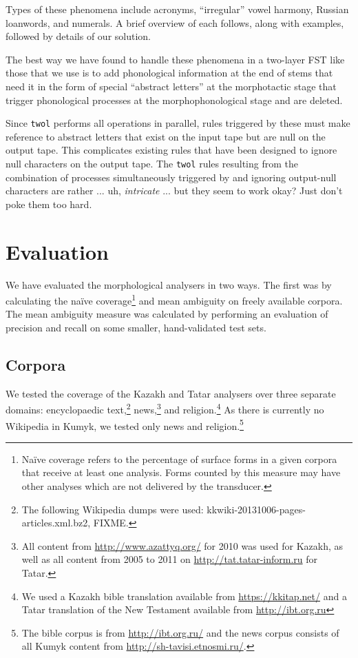\documentclass[a4paper,11pt,twocolumn]{article}
\begin{document}
Types of these phenomena include acronyms, ``irregular'' vowel harmony, Russian loanwords, and numerals.  A brief overview of each follows, along with examples, followed by details of our solution.


The best way we have found to handle these phenomena in a two-layer FST like those that we use is to add phonological information at the end of stems that need it in the form of special ``abstract letters'' at the morphotactic stage that trigger phonological processes at the morphophonological stage and are deleted.


Since \texttt{twol} performs all operations in parallel, rules triggered by these must make reference to abstract letters that exist on the input tape but are null on the output tape.  This complicates existing rules that have been designed to ignore null characters on the output tape.  The \texttt{twol} rules resulting from the combination of processes simultaneously triggered by and ignoring output-null characters are rather ... uh, \textit{intricate} ... but they seem to work okay?  Just don't poke them too hard.  %


\section{Evaluation}

We have evaluated the morphological analysers in two ways. The first was by calculating the naïve coverage\footnote{Naïve coverage refers to the percentage of surface forms in a given corpora that receive at least one analysis.  Forms counted by this measure may have other analyses which are not delivered by the transducer.} and mean ambiguity  on freely available corpora. The mean ambiguity measure was calculated by performing an evaluation of precision and recall on some smaller, hand-validated test sets.

\subsection{Corpora}

We tested the coverage of the Kazakh and Tatar analysers over three separate domains: encyclopaedic text,\footnote{The following Wikipedia dumps were used: kkwiki-20131006-pages-articles.xml.bz2, FIXME.} news,\footnote{All content from \url{http://www.azattyq.org/} for 2010 was used for Kazakh, as well as all content from 2005 to 2011 on \url{http://tat.tatar-inform.ru} for Tatar.} and religion.\footnote{We used a Kazakh bible translation available from \url{https://kkitap.net/} and a Tatar translation of the New Testament available from \url{http://ibt.org.ru}}  As there is currently no Wikipedia in Kumyk, we tested only news and religion.\footnote{The bible corpus is from \url{http://ibt.org.ru/} and the news corpus consists of all Kumyk content from \url{http://sh-tavisi.etnosmi.ru/}.}
\end{document}
